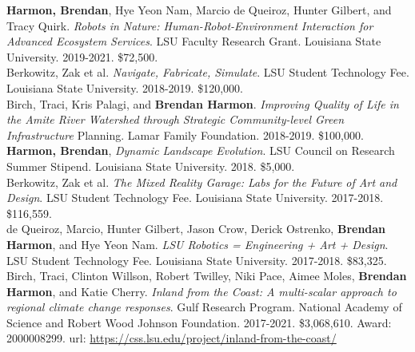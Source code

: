 \documentclass[10pt]{developercv} %
\begin{document}
\textbf{Harmon, Brendan}, Hye Yeon Nam, Marcio de Queiroz, Hunter Gilbert, and Tracy Quirk. 
\emph{Robots in Nature: Human-Robot-Environment Interaction for Advanced Ecosystem Services}. 
LSU Faculty Research Grant. 
Louisiana State University. 
2019-2021. \$72,500.\\

Berkowitz, Zak et al. 
\emph{Navigate, Fabricate, Simulate}. 
LSU Student Technology Fee. 
Louisiana State University. 
2018-2019.	\$120,000.\\

Birch, Traci, Kris Palagi, and \textbf{Brendan Harmon}. 
\emph{Improving Quality of Life in the Amite River Watershed through Strategic Community-level Green Infrastructure} Planning. 
Lamar Family Foundation. 
2018-2019. \$100,000.\\

\textbf{Harmon, Brendan}, 
\emph{Dynamic Landscape Evolution}. 
LSU Council on Research Summer Stipend. 
Louisiana State University. 
2018. \$5,000.\\

Berkowitz, Zak et al. 
\emph{The Mixed Reality Garage: Labs for the Future of Art and Design}. 
LSU Student Technology Fee. 
Louisiana State University. 
2017-2018. \$116,559.\\

de Queiroz, Marcio, Hunter Gilbert, Jason Crow, Derick Ostrenko, \textbf{Brendan Harmon}, and Hye Yeon Nam. 
\emph{LSU Robotics = Engineering + Art + Design}. 
LSU Student Technology Fee. 
Louisiana State University. 
2017-2018. \$83,325.\\

Birch, Traci, Clinton Willson, Robert Twilley, Niki Pace, Aimee Moles, \textbf{Brendan Harmon}, and Katie Cherry.
\emph{Inland from the Coast: A multi-scalar approach to regional climate change responses}. 
Gulf Research Program. 
National Academy of Science and Robert Wood Johnson Foundation.
2017-2021. \$3,068,610. Award: 2000008299.
url: \url{https://css.lsu.edu/project/inland-from-the-coast/}\\




\end{document}
